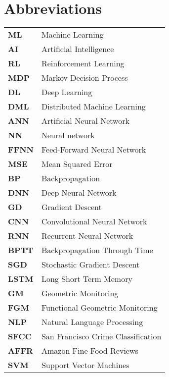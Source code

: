 \chapter{Abbreviations}\label{ch:abbreviations}

\begin{tabular}{ll}
    \textbf{ML}   & Machine Learning                   \\
    \textbf{AI}   & Artificial Intelligence            \\
    \textbf{RL}   & Reinforcement Learning             \\
    \textbf{MDP}  & Markov Decision Process            \\
    \textbf{DL}   & Deep Learning                      \\
    \textbf{DML}  & Distributed Machine Learning       \\
    \textbf{ANN}  & Artificial Neural Network          \\
    \textbf{NN}   & Neural network                     \\
    \textbf{FFNN} & Feed-Forward Neural Network        \\
    \textbf{MSE}  & Mean Squared Error                 \\
    \textbf{BP}   & Backpropagation                    \\
    \textbf{DNN}  & Deep Neural Network                \\
    \textbf{GD}   & Gradient Descent                   \\
    \textbf{CNN}  & Convolutional Neural Network       \\
    \textbf{RNN}  & Recurrent Neural Network           \\
    \textbf{BPTT} & Backpropagation Through Time       \\
    \textbf{SGD}  & Stochastic Gradient Descent        \\
    \textbf{LSTM} & Long Short Term Memory             \\
    \textbf{GM}   & Geometric Monitoring               \\
    \textbf{FGM}  & Functional Geometric Monitoring    \\
    \textbf{NLP}  & Natural Language Processing        \\
    \textbf{SFCC} & San Francisco Crime Classification \\
    \textbf{AFFR} & Amazon Fine Food Reviews           \\
    \textbf{SVM}  & Support Vector Machines            \\
\end{tabular}